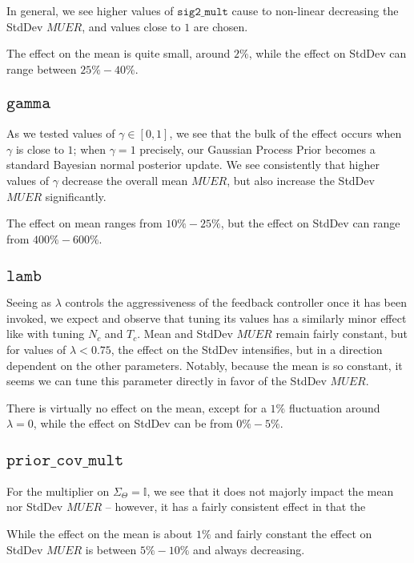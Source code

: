 In general, we see higher values of $\mathtt{sig2\_mult}$ cause to non-linear decreasing the StdDev $MUER$, and values close to $1$ are chosen.

The effect on the mean is quite small, around $2\%$, while the effect on StdDev can range between $25\% - 40\%$.

\subsection{$\mathtt{gamma}$}

As we tested values of $\gamma \in [0,1]$, we see that the bulk of the effect occurs when $\gamma$ is close to $1$; when $\gamma = 1$ precisely, our Gaussian Process Prior becomes a standard Bayesian normal posterior update.  We see consistently that higher values of $\gamma$ decrease the overall mean $MUER$, but also increase the StdDev $MUER$ significantly.

The effect on mean ranges from $10\% - 25\%$, but the effect on StdDev can range from $400\%-600\%$.

\subsection{$\mathtt{lamb}$}

Seeing as $\lambda$ controls the aggressiveness of the feedback controller once it has been invoked, we expect and observe that tuning its values has a similarly minor effect like with tuning $N_c$ and $T_c$.  Mean and StdDev $MUER$ remain fairly constant, but for values of $\lambda < 0.75$, the effect on the StdDev intensifies, but in a direction dependent on the other parameters.  Notably, because the mean is so constant, it seems we can tune this parameter directly in favor of the StdDev $MUER$.

There is virtually no effect on the mean, except for a $1\%$ fluctuation around $\lambda = 0$, while the effect on StdDev can be from $0\% - 5\%$.

\subsection{$\mathtt{prior\_cov\_mult}$}

For the multiplier on $\Sigma_\Theta = \mathbb{I}$, we see that it does not majorly impact the mean nor StdDev $MUER$ -- however, it has a fairly consistent effect in that the 

While the effect on the mean is about $1\%$ and fairly constant the effect on StdDev $MUER$ is between $5\% - 10\%$ and always decreasing.



